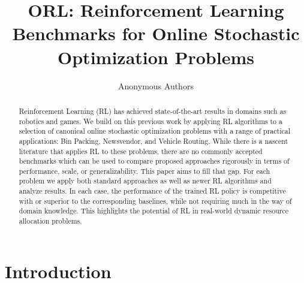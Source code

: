 \documentclass[letterpaper]{article} %
\title{ORL: Reinforcement Learning Benchmarks for Online Stochastic Optimization Problems}
\author{Anonymous Authors}
\begin{document}
\maketitle

\begin{abstract}
Reinforcement Learning (RL) has achieved state-of-the-art results in domains such as robotics and games.  We build on this previous work by applying RL algorithms to a selection of canonical online stochastic optimization problems with a range of practical applications: Bin Packing, Newsvendor, and Vehicle Routing.  While there is a nascent literature that applies RL to these problems, there are no commonly accepted benchmarks which can be used to compare proposed approaches rigorously in terms of performance, scale, or generalizability. This paper aims to fill that gap.  For each problem we apply both standard approaches as well as newer RL algorithms and analyze results.  In each case, the performance of the trained RL policy is competitive with or superior to the corresponding baselines, while not requiring much in the way of domain knowledge. This highlights the potential of RL in real-world dynamic resource allocation problems. 
\end{abstract}

\section{Introduction}
\end{document}
